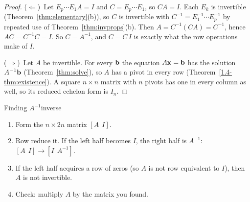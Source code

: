 \documentclass[11pt]{article}
\begin{document}
\begin{proof}
($\Leftarrow$)~Let $E_p\cdots E_1A=I$ and $C=E_p\cdots E_1$, so $CA=I$. Each $E_k$ is invertible (Theorem~\ref{thm:elementary}(b)), so $C$ is invertible with $C^{-1}=E_1^{-1}\cdots E_p^{-1}$ by repeated use of Theorem~\ref{thm:invprops}(b). Then $A=C^{-1}(CA)=C^{-1}$, hence $AC=C^{-1}C=I$. So $C=A^{-1}$, and $C=C\,I$ is exactly what the row operations make of $I$.

($\Rightarrow$)~Let $A$ be invertible. For every $\mathbf{b}$ the equation $A\mathbf{x}=\mathbf{b}$ has the solution $A^{-1}\mathbf{b}$ (Theorem~\ref{thm:solve}), so $A$ has a pivot in every row (Theorem~\ref{1.4-thm:existence}). A square $n\times n$ matrix with $n$ pivots has one in every column as well, so its reduced echelon form is $I_n$.
\end{proof}

\begin{proc}{Finding $A^{-1}$}{inverse}
\begin{enumerate}
  \item Form the $n\times2n$ matrix $[A\ \ I]$.
  \item Row reduce it. If the left half becomes $I$, the right half is $A^{-1}$: $[A\ \ I]\to[I\ \ A^{-1}]$.
  \item If the left half acquires a row of zeros (so $A$ is not row equivalent to $I$), then $A$ is not invertible.
  \item Check: multiply $A$ by the matrix you found.
\end{enumerate}
\end{proc}
\end{document}
